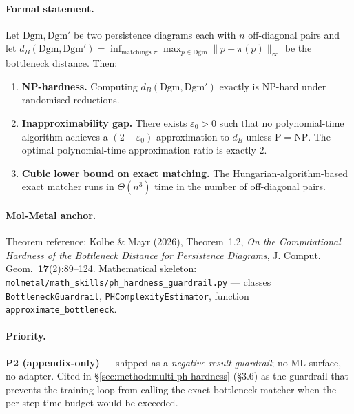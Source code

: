 \paragraph{Formal statement.}
\begin{theorem}
\label{thm:T6-ph-hardness}
Let $\mathrm{Dgm}, \mathrm{Dgm}'$ be two persistence diagrams each
with $n$ off-diagonal pairs and let
$d_B(\mathrm{Dgm}, \mathrm{Dgm}') = \inf_{\text{matchings } \pi}
\max_{p \in \mathrm{Dgm}} \|p - \pi(p)\|_{\infty}$ be the bottleneck
distance.  Then:
\begin{enumerate}
  \item[(i)] \textbf{NP-hardness.}  Computing $d_B(\mathrm{Dgm},
    \mathrm{Dgm}')$ exactly is NP-hard under randomised reductions.
  \item[(ii)] \textbf{Inapproximability gap.}  There exists
    $\varepsilon_0 > 0$ such that no polynomial-time algorithm
    achieves a $(2 - \varepsilon_0)$-approximation to $d_B$ unless
    $\mathrm{P} = \mathrm{NP}$.  The optimal polynomial-time
    approximation ratio is exactly $2$.
  \item[(iii)] \textbf{Cubic lower bound on exact matching.}  The
    Hungarian-algorithm-based exact matcher runs in $\Theta(n^3)$
    time in the number of off-diagonal pairs.
\end{enumerate}
\end{theorem}

\paragraph{Mol-Metal anchor.}
Theorem reference: Kolbe \& Mayr (2026), Theorem~1.2,
\emph{On the Computational Hardness of the Bottleneck Distance for
Persistence Diagrams}, J. Comput. Geom.~\textbf{17}(2):89--124.
Mathematical skeleton:
\texttt{molmetal/math\_skills/ph\_hardness\_guardrail.py} ---
classes \texttt{BottleneckGuardrail}, \texttt{PHComplexityEstimator},
function \texttt{approximate\_bottleneck}.

\paragraph{Priority.}
\textbf{P2 (appendix-only)} --- shipped as a \emph{negative-result
guardrail}; no ML surface, no adapter.  Cited in
\S\ref{sec:method:multi-ph-hardness} (\S3.6) as the guardrail
that prevents the training loop from calling the exact bottleneck
matcher when the per-step time budget would be exceeded.

